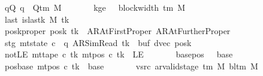 \begin{isabellebody}
\ \ \ \ \ \ \ qQ{\isacharcolon}{\kern0pt}\ {\isachardoublequoteopen}q\ {\isasymin}\ Q{\isacharunderscore}{\kern0pt}tm\ M{\isachardoublequoteclose}\isanewline
\ \ \ \ \ \ \ kge{}{\isacharcolon}{\kern0pt}\ {\isachardoublequoteopen}{}\ {\isasymle}\ block{\isacharunderscore}{\kern0pt}width\ {\isacharparenleft}{\kern0pt}{\isasymGamma}{\isacharunderscore}{\kern0pt}tm\ M{\isacharparenright}{\kern0pt}{\isachardoublequoteclose}\isanewline
\ \ \ \ \ \ \ last{\isacharcolon}{\kern0pt}\ {\isachardoublequoteopen}is{\isacharunderscore}{\kern0pt}last{\isacharunderscore}{\kern0pt}k\ M\ tk{\isachardoublequoteclose}\isanewline
\ \ \ \ \ \ \ posk{\isacharunderscore}{\kern0pt}proper{\isacharcolon}{\kern0pt}\ {\isachardoublequoteopen}posk\ tk\ {\isasymin}\ {\isacharbraceleft}{\kern0pt}AR{\isacharunderscore}{\kern0pt}AtFirstProper{\isacharcomma}{\kern0pt}\ AR{\isacharunderscore}{\kern0pt}AtFurtherProper{\isacharbraceright}{\kern0pt}{\isachardoublequoteclose}\isanewline
\ \ \ \ \ \ \ stg{\isacharcolon}{\kern0pt}\ {\isachardoublequoteopen}mt{\isacharunderscore}{\kern0pt}state\ c{\isacharprime}{\kern0pt}\ {\isacharequal}{\kern0pt}\ {\isacharparenleft}{\kern0pt}q{\isacharcomma}{\kern0pt}\ AR{\isacharunderscore}{\kern0pt}SimRead{\isacharcomma}{\kern0pt}\ tk{\isacharcomma}{\kern0pt}\ {}{\isacharcomma}{\kern0pt}\ buf{\isacharcomma}{\kern0pt}\ dvec{\isacharcomma}{\kern0pt}\ posk{\isacharparenright}{\kern0pt}{\isachardoublequoteclose}\isanewline
\ \ \ \ \ \ \ notLE{\isacharcolon}{\kern0pt}\ {\isachardoublequoteopen}mt{\isacharunderscore}{\kern0pt}tape\ c{\isacharprime}{\kern0pt}\ tk\ {\isacharparenleft}{\kern0pt}mt{\isacharunderscore}{\kern0pt}pos\ c{\isacharprime}{\kern0pt}\ tk{\isacharparenright}{\kern0pt}\ {\isasymnoteq}\ LE{}{\isachardoublequoteclose}\isanewline
\ \ \ \ \ \ \ base{\isacharunderscore}{\kern0pt}pos{\isacharcolon}{\kern0pt}\ {\isachardoublequoteopen}{}\ {\isacharless}{\kern0pt}\ base{\isachardoublequoteclose}\isanewline
\ \ \ \ \ \ \ pos{\isacharunderscore}{\kern0pt}base{\isacharcolon}{\kern0pt}\ {\isachardoublequoteopen}mt{\isacharunderscore}{\kern0pt}pos\ c{\isacharprime}{\kern0pt}\ tk\ {\isacharequal}{\kern0pt}\ base{\isachardoublequoteclose}\isanewline
\ \ \ \ \ \ \ vsrc{\isacharcolon}{\kern0pt}\ {\isachardoublequoteopen}ar{\isacharunderscore}{\kern0pt}valid{\isacharunderscore}{\kern0pt}stage\ {\isacharparenleft}{\kern0pt}{\isasymGamma}{\isacharunderscore}{\kern0pt}tm\ M{\isacharparenright}{\kern0pt}\ {\isacharparenleft}{\kern0pt}bl{\isacharunderscore}{\kern0pt}tm\ M{\isacharparenright}{\kern0pt}\isanewline

\end{isabellebody}
